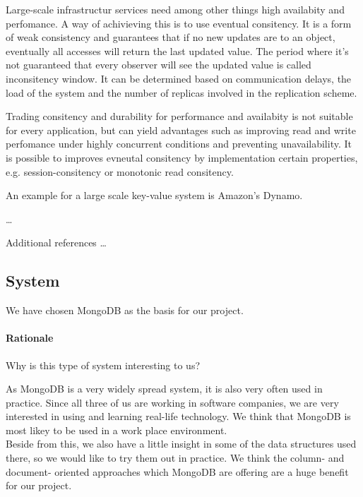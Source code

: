 \begin{packed_enum}
   \item 
   Large-scale infrastructur services need among other things high availabity and perfomance.
A way of achivieving this is to use eventual consitency. It is a form of weak consistency
and guarantees that if no new updates are to an object, eventually all accesses will return
the last updated value. The period where it's not guaranteed that every observer will see the
updated value is called inconsitency window. It can be determined based on communication delays,
the load of the system and the number of replicas involved in the replication scheme.
 
Trading consitency and durability for performance and availabity is not suitable for every
application, but can yield advantages such as improving read and write perfomance under highly concurrent
conditions and preventing unavailability. It is possible to improves evneutal consitency 
by implementation certain properties, e.g. session-consitency or monotonic read consitency.

An example for a large scale key-value system is Amazon's Dynamo.

   \item \ldots
   \item Additional references \ldots
\end{packed_enum}

\subsection{System}

We have chosen MongoDB as the basis for our project.

\paragraph{Rationale} Why is this type of system interesting to us? 

As MongoDB is a very widely spread system, it is also very often used in practice. Since all three of us are working in software companies, we are very interested in using and learning real-life technology. We think that MongoDB is most likey to be used in a work place environment. \\ 

Beside from this, we also have a little insight in some of the data structures used there, so we would like to try them out in practice. We think the column- and document- oriented approaches which MongoDB are offering are a huge benefit for our project.

